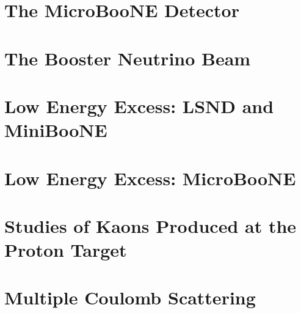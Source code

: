 \documentclass[11pt,openright,twoside,letterpaper,onecolumn]{report} %
\begin{document}
\chapter{The MicroBooNE Detector}
\label{sec:detector}


\chapter{The Booster Neutrino Beam}
\label{sec:beam}


\chapter{Low Energy Excess: LSND and MiniBooNE}
\label{sec:LEEhistory}


\chapter{Low Energy Excess: MicroBooNE}
\label{sec:LEEsensitivity}


\chapter{Studies of Kaons Produced at the Proton Target}
\label{sec:kaon}


\chapter{Multiple Coulomb Scattering}
\label{sec:MCS}


% 


 

\end{document}
